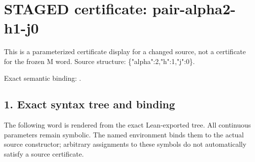 \section*{STAGED certificate: pair-alpha2-h1-j0}
This is a parameterized certificate display for a changed source, not a certificate for the frozen M word.
Source structure: \{"alpha":2,"h":1,"j":0\}.

\noindent Exact semantic binding: .

\subsection*{1. Exact syntax tree and binding}
The following word is rendered from the exact Lean-exported tree. All continuous parameters remain symbolic. The named environment binds them to the actual source constructor; arbitrary assignments to these symbols do not automatically satisfy a source certificate.


